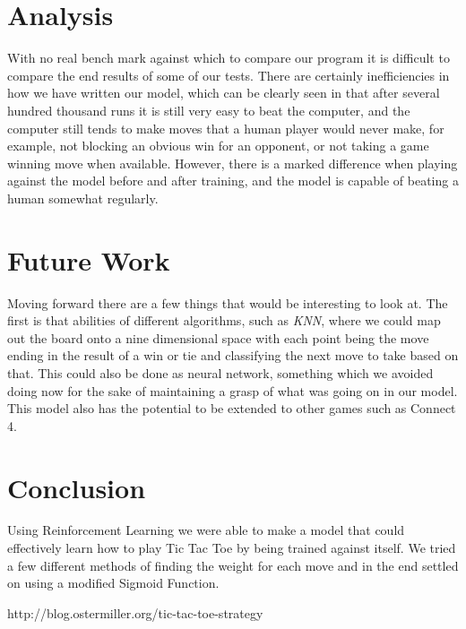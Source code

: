\documentclass{article}
\begin{document}
\section{Analysis}
With no real bench mark against which to compare our program it is difficult to compare the end results of some of our tests. There are certainly inefficiencies in how we have written our model, which can be clearly seen in that after several hundred thousand runs it is still very easy to beat the computer, and the computer still tends to make moves that a human player would never make, for example, not blocking an obvious win for an opponent, or not taking a game winning move when available. However, there is a marked difference when playing against the model before and after training, and the model is capable of beating a human somewhat regularly.

\section{Future Work}
Moving forward there are a few things that would be interesting to look at. The first is that abilities of different algorithms, such as \textit{KNN}, where we could map out the board onto a nine dimensional space with each point being the move ending in the result of a win or tie and classifying the next move to take based on that. This could also be done as neural network, something which we avoided doing now for the sake of maintaining a grasp of what was going on in our model. This model also has the potential to be extended to other games such as Connect 4.

\section{Conclusion}
Using Reinforcement Learning we were able to make a model that could effectively learn how to play Tic Tac Toe by being trained against itself. We tried a few different methods of finding the weight for each move and in the end settled on using a modified Sigmoid Function. 

http://blog.ostermiller.org/tic-tac-toe-strategy
 
\end{document}
